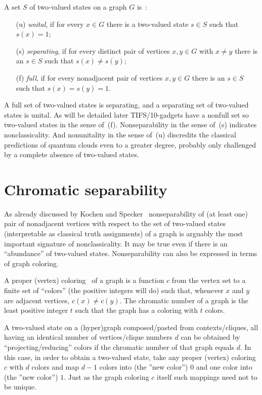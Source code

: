 \documentclass[%
  reprint,
  twocolumn,
 showpacs,
 showkeys,
 preprintnumbers,
 amsmath,amssymb,
 aps,
  prl,
  longbibliography,
 ]{revtex4-1}
\begin{document}
A set $S$ of two-valued states on a graph $G$ is~\cite{svozil-tkadlec,tkadlec-96}:
\begin{itemize}
\item[(u)] {\em unital}, if for every $x\in G$ there is a two-valued state $s\in S$
such that $s(x) = 1$;
\item[(s)] {\em separating}, if for every distinct pair of vertices $x,y\in G$
with $x\neq y$ there is an $s\in S$ such that $s (x) \neq s (y)$;
\item[(f)] {\em full}, if for every nonadjacent pair of vertices $x,y\in G$
there is an $s \in S$ such that $s (x) = s (y) = 1$.
\end{itemize}
A full set of
two-valued states is separating,
and a separating set of
two-valued states is unital.
As will be detailed later TIFS/10-gadgets have a nonfull set so two-valued states in the sense of~(f).
Nonseparability in the sense of~(s) indicates nonclassicality.
And nonunitality in the sense of~(u) discredits the classical predictions of quantum clouds
even to a greater degree, probably only challenged by a complete absence of two-valued states.


\section{Chromatic separability}

As already discussed by Kochen and Specker~\cite[Theorem~0]{kochen1}
nonseparability of (at least one) pair of nonadjacent vertices
with respect to the set of two-valued states
(interpretable as classical truth assignments) of a graph
is arguably the most important signature of nonclassicality.
It may be true even if there is an ``abundance'' of two-valued states.
Nonseparability can also be expressed in terms of graph coloring.

 A proper (vertex)
coloring~\cite[Appendix]{Godsil-Newman-2008} of a graph is a function $c$ from the vertex set to a finite
set of ``colors'' (the positive integers will do) such that,
whenever $x$ and $y$ are adjacent vertices,
$c(x) \neq c(y)$.
The chromatic number of a graph  is the least positive integer $t$ such
that the graph has a coloring with $t$ colors.


A two-valued state on a (hyper)graph composed/pasted from contexts/cliques,
all having an identical
number of vertices/clique numbers $d$ can be obtained by ``projecting/reducing'' colors
if the chromatic number of that graph equals $d$.
In this case, in order to obtain a two-valued state,
take any proper (vertex) coloring $c$ with $d$ colors
and  map $d-1$ colors into (the ''new color'') $0$ and one color into (the ''new color'') $1$.
Just as the graph coloring $c$ itself such mappings need not to be unique.
\end{document}
